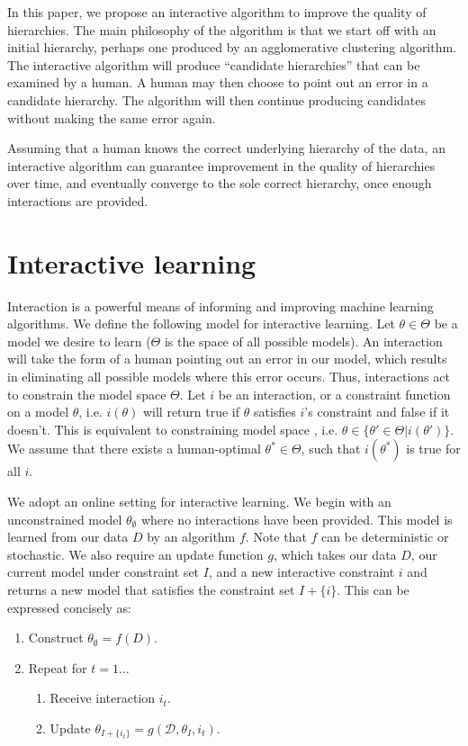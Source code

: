 \documentclass[12pt]{article}
\begin{document}
In this paper, we propose an interactive algorithm to improve the quality of
hierarchies. The main philosophy of the algorithm is that we start off with an initial
hierarchy, perhaps one produced by an agglomerative clustering algorithm. 
The interactive algorithm will produce ``candidate hierarchies'' that can be 
examined by a human.
A human may then choose to point out an error in a candidate hierarchy.
The algorithm will then continue producing candidates
without making the same error again.

Assuming that a human knows the correct underlying hierarchy of the data,
an interactive algorithm can guarantee improvement in the quality of hierarchies
over time, and eventually converge to the sole correct hierarchy,
once enough interactions are provided.

\section{Interactive learning}
Interaction is a powerful means of informing and improving machine learning algorithms.
We define the following model for interactive learning.
Let $\theta \in \Theta$ be a model we desire to learn 
($\Theta$ is the space of all possible models).
An interaction will take the form of a human
pointing out an error in our model, which results in
eliminating all possible models where this error occurs.
Thus, interactions act to constrain the model space $\Theta$.
Let $i$ be an interaction, or a constraint function
on a model $\theta$, i.e. $i(\theta)$ will return true
if $\theta$ satisfies $i$'s constraint and false if
it doesn't. This is equivalent to constraining model space 
, i.e. $\theta \in \{\theta' \in \Theta | i(\theta')\}$.
We assume that there exists a human-optimal $\theta^* \in \Theta$,
such that $i(\theta^*)$ is true for all $i$.

We adopt an online setting for interactive learning.
We begin with an unconstrained model $\theta_\emptyset$ where no interactions
have been provided. This model is learned from our data $D$ by
an algorithm $f$. Note that $f$
can be deterministic or stochastic. We also require an
update function $g$, which takes our data $D$,
our current model under constraint set $I$, and
a new interactive constraint $i$ and returns a new
model that satisfies the constraint set $I + \{i\}$.
This can be expressed concisely as:

\begin{enumerate}
\item Construct $\theta_\emptyset = f(D)$.\\
\item Repeat for $t = 1\ldots$
\begin{enumerate}
    \item Receive interaction $i_t$.
    \item Update $\theta_{I + \{i_t\}} = g(\mathcal{D}, \theta_I, i_t)$.
\end{enumerate}
\end{enumerate}
\end{document}
